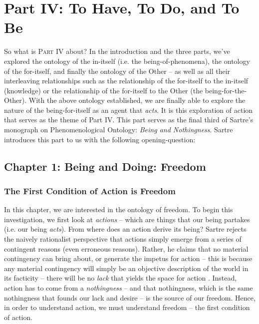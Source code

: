 \chapter{Part IV: To Have, To Do, and To Be}

So what is \textsc{Part IV} about? In the introduction and the three parts, we've explored the ontology of the in-itself (i.e. the being-of-phenomena), the ontology of the for-itself, and finally the ontology of the Other -- as well as all their interleaving relationships such as the relationship of the for-itself to the in-itself (knowledge) or the relationship of the for-itself to the Other (the being-for-the-Other). With the above ontology established, we are finally able to explore the nature of the being-for-itself as an agent that \emph{acts}. It is this exploration of action that serves as the theme of Part IV. This part serves as the final third of Sartre's monograph on Phenomenological Ontology: \emph{Being and Nothingness}. Sartre introduces this part to us with the following opening-question:


\section{Chapter 1: Being and Doing: Freedom}

\subsection{The First Condition of Action is Freedom}

In this chapter, we are interested in the ontology of freedom. To begin this investigation, we first look at \emph{actions} -- which are things that our being partakes (i.e. our being \emph{acts}). From where does an action derive its being? Sartre rejects the naively rationalist perspective that actions simply emerge from a series of contingent reasons (even erroneous reasons). Rather, he claims that no material contingency can bring about, or generate the impetus for action -- this is because any material contingency will simply be an objective description of the world in its facticity -- there will be no \emph{lack} that yields the space for action \autocite[574]{sartre}. Instead, action has to come from a \emph{nothingness} -- and that nothingness, which is the same nothingness that founds our lack and desire -- is the source of our freedom. Hence, in order to understand action, we must understand freedom -- the first condition of action.


